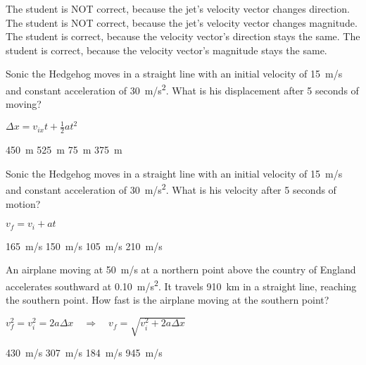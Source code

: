 \documentclass[answers]{exam}
\begin{document}
\begin{questions}
\begin{randomizechoices}
    \correctchoice The student is NOT correct, because the jet's velocity vector changes direction.
    \choice The student is NOT correct, because the jet's velocity vector changes magnitude.
    \choice The student is correct, because the velocity vector's direction stays the same.
    \choice The student is correct, because the velocity vector's magnitude stays the same.
\end{randomizechoices}

\question %
Sonic the Hedgehog moves in a straight line with an initial velocity of \SI{15}{m/s} and constant acceleration of \SI{30}{m/s^2}. What is his displacement after 5 seconds of moving?

\ifprintanswers
\bgroup
\color{red}
$\displaystyle \Delta x = v_{ix} t + \frac{1}{2}at^2$
\egroup
\fi

\begin{randomizechoices}
    \correctchoice \SI{450}{m}
    \choice \SI{525}{m}
    \choice \SI{75}{m}
    \choice \SI{375}{m}
\end{randomizechoices}


\question
Sonic the Hedgehog moves in a straight line with an initial velocity of \SI{15}{m/s} and constant acceleration of \SI{30}{m/s^2}. What is his velocity after 5 seconds of motion?

\ifprintanswers
\bgroup
\color{red}
$v_f = v_i + a t$
\egroup
\fi

\begin{randomizechoices}
    \correctchoice \SI{165}{m/s}
    \choice \SI{150}{m/s}
    \choice \SI{105}{m/s}
    \choice \SI{210}{m/s}
\end{randomizechoices}


\question
An airplane moving at \SI{50}{m/s} at a northern point above the country of England accelerates southward at \SI{0.10}{m/s^2}. It travels \SI{910}{km} in a straight line, reaching the southern point. How fast is the airplane moving at the southern point?

\begin{center}
\end{center}

\ifprintanswers
\bgroup
\color{red}
$\displaystyle v_f^2 = v_i^2 = 2 a \Delta x \quad \Rightarrow \quad 
v_f = \sqrt{v_i^2 + 2a \Delta x}$
\egroup
\fi

\begin{randomizechoices}
    \correctchoice \SI{430}{m/s}
    \choice \SI{307}{m/s}
    \choice \SI{184}{m/s}
    \choice \SI{945}{m/s}
\end{randomizechoices}


\end{questions}
\end{document}
